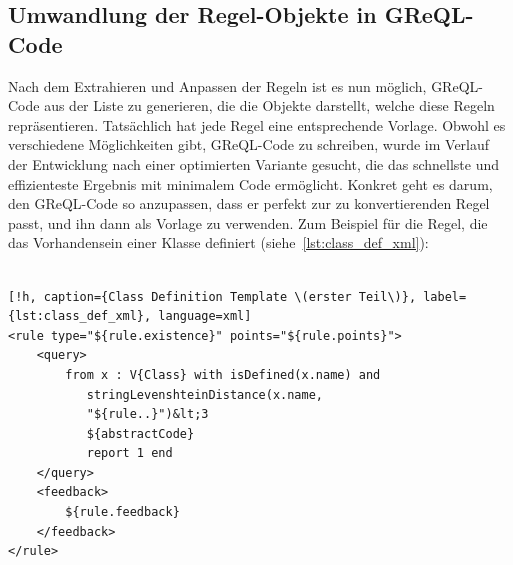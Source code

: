 \subsection{Umwandlung der Regel-Objekte in GReQL-Code}\label{subsec:umwandlung-der-regel-objekte-in-greql-code}
Nach dem Extrahieren und Anpassen der Regeln ist es nun möglich, GReQL-Code aus der Liste zu generieren, die die Objekte
darstellt, welche diese Regeln repräsentieren. Tatsächlich hat jede Regel eine entsprechende Vorlage. Obwohl es
verschiedene Möglichkeiten gibt, GReQL-Code zu schreiben, wurde im Verlauf der Entwicklung nach einer optimierten
Variante gesucht, die das schnellste und effizienteste Ergebnis mit minimalem Code ermöglicht. Konkret geht es darum,
den GReQL-Code so anzupassen, dass er perfekt zur zu konvertierenden Regel passt, und ihn dann als Vorlage zu verwenden.
Zum Beispiel für die Regel, die das Vorhandensein einer Klasse definiert (siehe~\ref{lst:class_def_xml}):
\\~\\
\begin{lstlisting}[!h, caption={Class Definition Template \(erster Teil\)}, label={lst:class_def_xml}, language=xml]
<rule type="${rule.existence}" points="${rule.points}">
    <query>
        from x : V{Class} with isDefined(x.name) and
           stringLevenshteinDistance(x.name,
           "${rule..}")&lt;3
           ${abstractCode}
           report 1 end
    </query>
    <feedback>
        ${rule.feedback}
    </feedback>
</rule>
\end{lstlisting}

